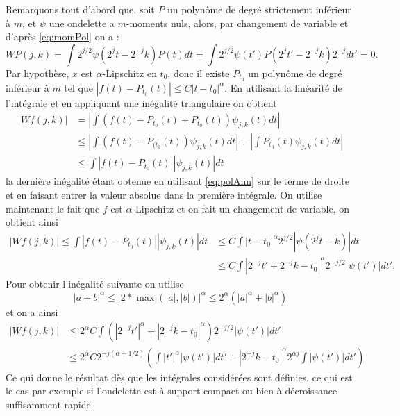 \begin{preuve}
	Remarquons tout d'abord que, soit $P$ un polynôme de degré strictement inférieur à $m$, et $\psi$ une ondelette a $m$-moments nuls, alors, par changement de variable et d'après \ref{eq:momPol} on a :
	\begin{equation}\label{eq:polAnn}
		WP(j, k) = \int 2^{j/2} \psi(2^jt - 2^{-j}k) P(t)dt 
		= \int 2^{j/2}\psi(t')P(2^jt' - 2^{-j} k) 2^{-j} dt' = 0.
	\end{equation}
	Par hypothèse, $x$ est $\alpha$-Lipschitz en $t_0$, donc il existe $P_{t_0}$ un polynôme de degré inférieur à $m$ tel que $|f(t) - P_{t_0}(t)| \leq C|t - t_0|^{\alpha}$.
	En utilisant la linéarité de l'intégrale et en appliquant une inégalité triangulaire on obtient
	\begin{align*}
		|Wf(j,k)| &= \left|\int (f(t) -P_{t_0}(t) + P_{t_0}(t)) \psi_{j, k}(t) dt\right| \\
			&\leq \left|\int (f(t) - P_{(t_0}(t)) \psi_{j,k}(t)dt\right| + \left|\int P_{t_0}(t) \psi_{j,k}(t)dt\right| \\ 
			&\leq \int| f(t) - P_{t_0}(t)| |\psi_{j,k}(t)|dt  
	\end{align*}
	la dernière inégalité étant obtenue en utilisant \ref{eq:polAnn} sur le terme de droite et en faisant entrer la valeur absolue dans la première intégrale.
	On utilise maintenant le fait que $f$ est $\alpha$-Lipschitz et on fait un changement de variable, on obtient ainsi
	\begin{align*}
		| Wf(j,k)| \leq \int |f(t) - P_{t_0}(t)||\psi_{j,k}(t)|dt &\leq C\int |t - t_0|^\alpha 2^{j/2} |\psi(2^jt - k)|dt \\
		&\leq C \int |2^{-j} t' + 2^{-j}k - t_0|^\alpha 2^{-j/2} |\psi(t')| dt'. 
	\end{align*}
	Pour obtenir l'inégalité suivante on utilise
	\begin{equation*}
		|a + b|^\alpha \leq |2*\max(|a|, |b|)|^\alpha \leq 2^\alpha (|a|^\alpha + |b|^\alpha)
	\end{equation*}
	et on a ainsi
	\begin{align*}
		|Wf(j,k)| &\leq 2^\alpha C \int (|2^{-j}t'|^\alpha + |2^{-j}k-t_0|^\alpha)2^{-j/2} |\psi(t')|dt'\\
		&\leq 2^\alpha C 2^{-j(\alpha + 1/2)}\left( \int|t'|^\alpha |\psi(t')|dt' + |2^{-j}k-t_0|^\alpha 2^{\alpha j}\int |\psi(t')|dt' \right)
	\end{align*}
	Ce qui donne le résultat dès que les intégrales considérées sont définies, ce qui est le cas par exemple si l'ondelette est à support compact ou bien à décroissance suffisamment rapide. 
\end{preuve}
